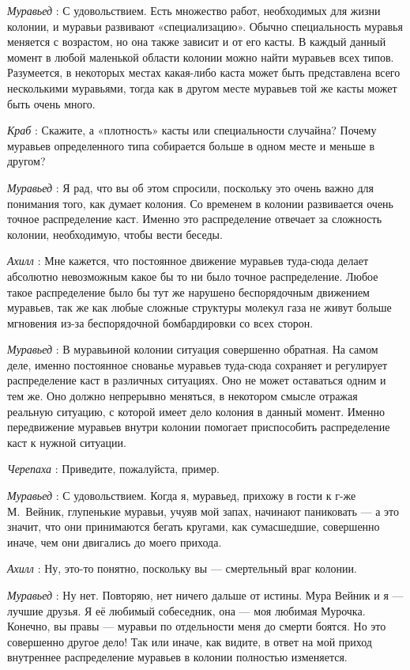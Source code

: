 \documentclass[../main.tex]{subfiles}
\begin{document}
\begin{dialogue}
\emph{Муравьед} : С удовольствием. Есть множество работ, необходимых для жизни колонии, и муравьи развивают «специализацию». Обычно специальность муравья меняется с возрастом, но она также зависит и от его касты. В каждый данный момент в любой маленькой области колонии можно найти муравьев всех типов. Разумеется, в некоторых местах какая-либо каста может быть представлена всего несколькими муравьями, тогда как в другом месте муравьев той же касты может быть очень много.

\emph{Краб} : Скажите, а «плотность» касты или специальности случайна? Почему муравьев определенного типа собирается больше в одном месте и меньше в другом?

\emph{Муравьед} : Я рад, что вы об этом спросили, поскольку это очень важно для понимания того, как думает колония. Со временем в колонии развивается очень точное распределение каст. Именно это распределение отвечает за сложность колонии, необходимую, чтобы вести беседы.

\emph{Ахилл} : Мне кажется, что постоянное движение муравьев туда-сюда делает абсолютно невозможным какое бы то ни было точное распределение. Любое такое распределение было бы тут же нарушено беспорядочным движением муравьев, так же как любые сложные структуры молекул газа не живут больше мгновения из-за беспорядочной бомбардировки со всех сторон.

\emph{Муравьед} : В муравьиной колонии ситуация совершенно обратная. На самом деле, именно постоянное снованье муравьев туда-сюда сохраняет и регулирует распределение каст в различных ситуациях. Оно не может оставаться одним и тем же. Оно должно непрерывно меняться, в некотором смысле отражая реальную ситуацию, с которой имеет дело колония в данный момент. Именно передвижение муравьев внутри колонии помогает приспособить распределение каст к нужной ситуации.

\emph{Черепаха} : Приведите, пожалуйста, пример.

\emph{Муравьед} : С удовольствием. Когда я, муравьед, прихожу в гости к г-же М.~Вейник, глупенькие муравьи, учуяв мой запах, начинают паниковать --- а это значит, что они принимаются бегать кругами, как сумасшедшие, совершенно иначе, чем они двигались до моего прихода.

\emph{Ахилл} : Ну, это-то понятно, поскольку вы --- смертельный враг колонии.

\emph{Муравьед} : Ну нет. Повторяю, нет ничего дальше от истины. Мура Вейник и я --- лучшие друзья. Я её любимый собеседник, она --- моя любимая Мурочка. Конечно, вы правы --- муравьи по отдельности меня до смерти боятся. Но это совершенно другое дело! Так или иначе, как видите, в ответ на мой приход внутреннее распределение муравьев в колонии полностью изменяется.


\end{dialogue}
\end{document}
